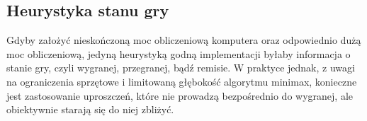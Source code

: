 \subsection{Heurystyka stanu gry}
\label{subsec:heurystyka-stanu-gry}

Gdyby założyć nieskończoną moc obliczeniową komputera oraz odpowiednio dużą moc obliczeniową, jedyną heurystyką godną implementacji byłaby informacja o stanie gry, czyli wygranej, przegranej, bądź remisie.
W praktyce jednak, z uwagi na ograniczenia sprzętowe i limitowaną głębokość algorytmu minimax, konieczne jest zastosowanie uproszczeń, które nie prowadzą bezpośrednio do wygranej, ale obiektywnie starają się do niej zbliżyć.